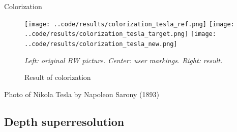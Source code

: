 \documentclass{beamer}
\begin{document}
\begin{frame}{Colorization}
    \begin{figure}
    \centering
    \texttt{[image: ..code/results/colorization\_tesla\_ref.png]}
    \pause
    \texttt{[image: ..code/results/colorization\_tesla\_target.png]}
    \pause
    \texttt{[image: ..code/results/colorization\_tesla\_new.png]}
    \caption{Result of colorization}
    {\it Left: original BW picture. Center: user markings. Right: result.}
\end{figure}

{\small Photo of Nikola Tesla by Napoleon Sarony (1893)}
\end{frame}

\subsection{Depth superresolution}
\end{document}
